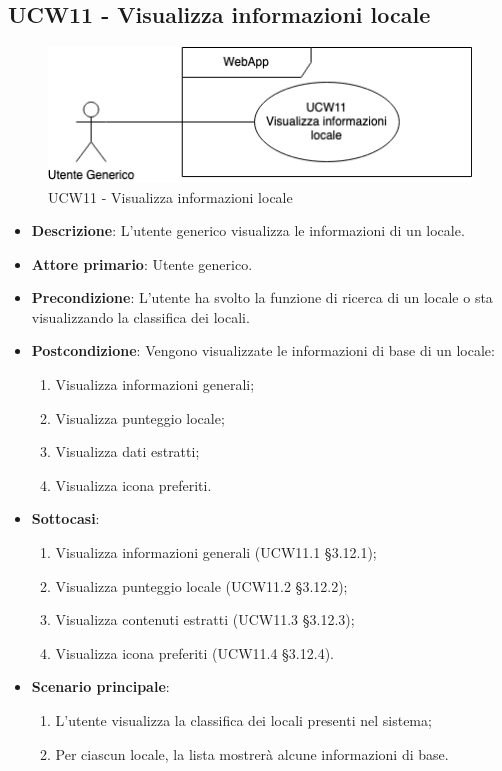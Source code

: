 \subsection{UCW11 - Visualizza informazioni locale}
\begin{figure}[!h]
\centering
\includegraphics[scale=0.5]{UC_images/UCW11.png} 
\caption{UCW11 - Visualizza informazioni locale}
\end{figure}
\begin{itemize}
    \item \textbf{Descrizione}: L'utente generico visualizza le informazioni di un locale.
    \item \textbf{Attore primario}: Utente generico.
    \item \textbf{Precondizione}: L'utente ha svolto la funzione di ricerca di un locale o sta visualizzando la classifica dei locali.
    \item \textbf{Postcondizione}: Vengono visualizzate le informazioni di base di un locale:
    \begin{enumerate}
        \item Visualizza informazioni generali;
        \item Visualizza punteggio locale;
        \item Visualizza dati estratti;
        \item Visualizza icona preferiti.
    \end{enumerate}   
	\item \textbf{Sottocasi}:    
	\begin{enumerate}  
		\item Visualizza informazioni generali (UCW11.1 \S{}3.12.1);
		\item Visualizza punteggio locale (UCW11.2 \S{}3.12.2);
		\item Visualizza contenuti estratti (UCW11.3 \S{}3.12.3);
		\item Visualizza icona preferiti (UCW11.4 \S{}3.12.4).
	\end{enumerate}
    \item \textbf{Scenario principale}: 
    \begin{enumerate}
	\item L'utente visualizza la classifica dei locali presenti nel sistema;
    \item Per ciascun locale, la lista mostrerà alcune informazioni di base.
    \end{enumerate}
\end{itemize}

